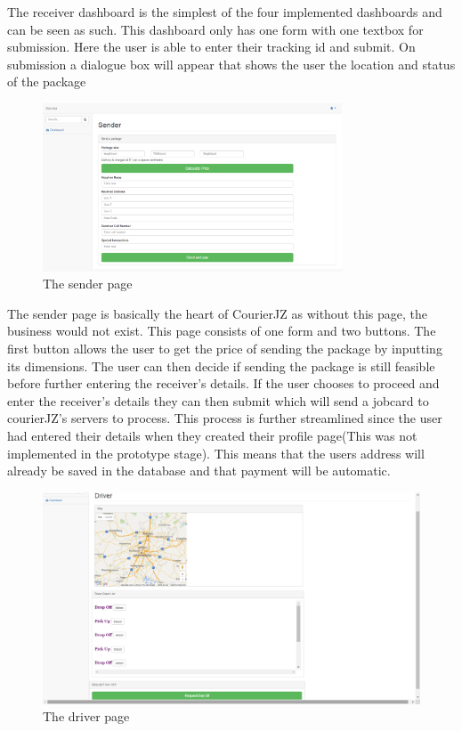 \documentclass[paper=a4, fontsize=11pt]{scrartcl} %
\numberwithin{equation}{section} %
\numberwithin{figure}{section} %
\numberwithin{table}{section} %
\begin{document}
The receiver dashboard is the simplest of the four implemented dashboards and can be seen as such. This dashboard only has one form with one textbox for submission. Here the user is able to enter their tracking id and submit. On submission a dialogue box will appear that shows the user the location and status of the package

\begin{figure}[hbt!]
\centering
\includegraphics[width=3.5in]{pictures/sender_page.png}
\caption{The sender page}
\label{SenderPage}
\end{figure}

The sender page is basically the heart of CourierJZ as without this page, the business would not exist. This page consists of one form and two buttons. The first button allows the user to get the price of sending the package by inputting its dimensions. The user can then decide if sending the package is still feasible before further entering the receiver's details. If the user chooses to proceed and enter the receiver's details they can then submit which will send a jobcard to courierJZ's servers to process. This process is further streamlined since the user had entered their details when they created their profile page(This was not implemented in the prototype stage). This means that the users address will already be saved in the database and that payment will be automatic.

\begin{figure}[hbt!]
\centering
\includegraphics[width=4.5in]{pictures/driver_page.png}
\caption{The driver page}
\label{DriverPage}
\end{figure}
\end{document}
